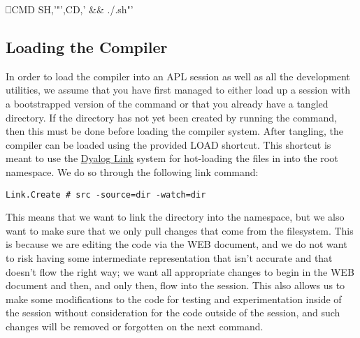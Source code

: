 \documentclass{article}%
\begin{document}
⎕CMD SH,'"',CD,' && ./.sh"'
\eatline
{}\nwendcode{}\nwdocspar
\subsection{Loading the Compiler}

In order to load the compiler into an APL session as well as all the
development utilities,
we assume that you have first managed to either load up a session
with a bootstrapped version of the {\Tt{}\nwendquote} command or that you
already have a tangled {\Tt{}\nwendquote} directory.
If the {\Tt{}\nwendquote} directory has not yet been created by running the
{\Tt{}\nwendquote} command,
then this must be done before loading the compiler system.
After tangling,
the compiler can be loaded using the provided {\Tt{}LOAD\nwendquote} shortcut.
This shortcut is meant to use the
\href{https://github.com/Dyalog/link}{Dyalog Link}
system for hot-loading the files in {\Tt{}\nwendquote} into the root namespace.
We do so through the following link command:

\begin{verbatim}
Link.Create # src -source=dir -watch=dir
\end{verbatim}

\noindent
This means that we want to link the {\Tt{}\nwendquote} directory into the {\Tt{}{\#}\nwendquote}
namespace,
but we also want to make sure that we only pull changes that come
from the filesystem.
This is because we are editing the code via the WEB document,
and we do not want to risk having some intermediate representation
that isn't accurate and that doesn't flow the right way;
we want all appropriate changes to begin in the WEB document
and then, and only then, flow into the session.
This also allows us to make some modifications to the code for testing
and experimentation inside of the session without consideration
for the code outside of the session,
and such changes will be removed or forgotten on the next {\Tt{}\nwendquote}
command.
\end{document}
